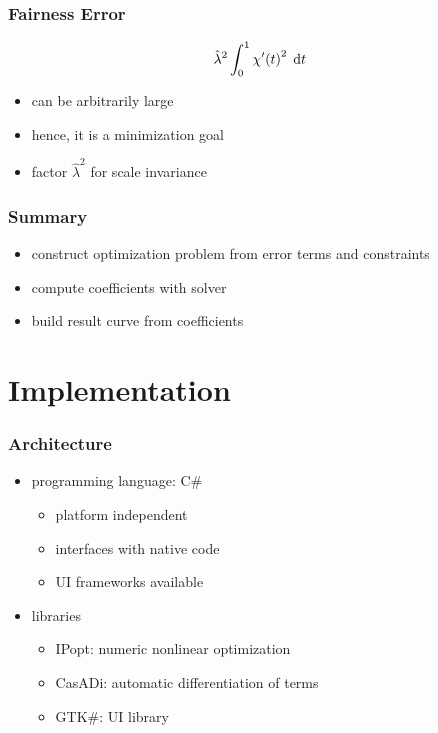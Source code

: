 \documentclass[mathserif]{beamer}
\begin{document}
		\begin{frame}
			\frametitle{Fairness Error}
			\begin{equation*}
				\hat{\lambda}^2\int_{0}^{1} \chi'\!\left( t \right)^2 \; \mathrm{d}t
			\end{equation*}
			\begin{itemize}
				\item can be arbitrarily large
				\item hence, it is a minimization goal
				\item factor \(\hat{\lambda}^2\) for scale invariance
			\end{itemize}
		\end{frame}
		
		\begin{frame}
			\frametitle{Summary}
			\begin{itemize}
				\item construct optimization problem from error terms and constraints
				\item compute coefficients with solver
				\item build result curve from coefficients
			\end{itemize}
		\end{frame}
		
	\section{Implementation}
	
		\begin{frame}
			\frametitle{Architecture}
			\begin{itemize}
				\item programming language: C\#
				\begin{itemize}
					\item platform independent
					\item interfaces with native code
					\item UI frameworks available
				\end{itemize}
				\item libraries
				\begin{itemize}
					\item IPopt: numeric nonlinear optimization
					\item CasADi: automatic differentiation of terms
					\item GTK\#: UI library
				\end{itemize}
			\end{itemize}
		\end{frame}
		
\end{document}
